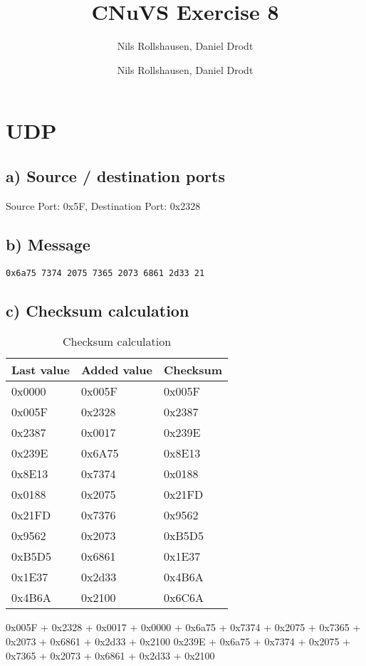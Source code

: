 \documentclass[a4paper, 11 pt, article, accentcolor=tud7b]{tudreport}
\title{CNuVS Exercise 8}
\author{Nils Rollshausen, Daniel Drodt}
\subtitle{Nils Rollshausen, Daniel Drodt}
\begin{document}
	\maketitle
	\section{UDP}
	\subsection*{a) Source / destination ports}
	Source Port: 0x5F, Destination Port: 0x2328
	  
	\subsection*{b) Message}
	\verb|0x6a75 7374 2075 7365 2073 6861 2d33 21|
	
	\subsection*{c) Checksum calculation}
	
	\begin{table}[h]
	  \centering
	  \begin{tabular}{| l | l | l |}
	    \hline
	    Last value & Added value & Checksum \\ \hline
	    0x0000 & 0x005F & 0x005F \\ \hline
	    0x005F & 0x2328 & 0x2387 \\ \hline
	    0x2387 & 0x0017 & 0x239E \\ \hline
	    0x239E & 0x6A75 & 0x8E13 \\ \hline
	    0x8E13 & 0x7374 & 0x0188 \\ \hline
	    0x0188 & 0x2075 & 0x21FD \\ \hline
	    0x21FD & 0x7376 & 0x9562 \\ \hline
	    0x9562 & 0x2073 & 0xB5D5 \\ \hline
	    0xB5D5 & 0x6861 & 0x1E37 \\ \hline
	    0x1E37 & 0x2d33 & 0x4B6A \\ \hline
	    0x4B6A & 0x2100 & 0x6C6A \\ \hline
	  \end{tabular}
	  \caption{Checksum calculation}
	\end{table}
	0x005F + 0x2328 + 0x0017 + 0x0000 + 0x6a75 + 0x7374 + 0x2075 + 0x7365 + 0x2073 + 0x6861 + 0x2d33 + 0x2100
	0x239E + 0x6a75 + 0x7374 + 0x2075 + 0x7365 + 0x2073 + 0x6861 + 0x2d33 + 0x2100
\end{document}

